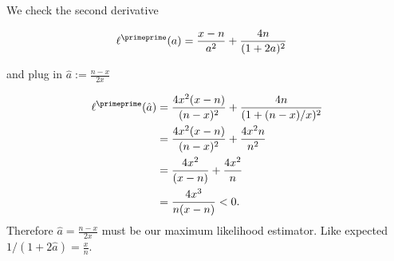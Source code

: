 \begin{solution}
We check the second derivative

\begin{align*}
  \ell^{\primeprime}(a) &= \frac{x-n}{a^2} + \frac{4n}{(1 + 2a)^2}
\end{align*}

and plug in $\hat{a} := \frac{n-x}{2x}$

\begin{align*}
  \ell^{\primeprime}(\hat{a}) &= \frac{4x^2(x-n)}{(n-x)^2} + 
  \frac{4n}{(1 + (n-x)/x)^2} \\
  &= \frac{4x^2(x-n)}{(n-x)^2} + \frac{4x^2n}{n^2} \\
  &= \frac{4x^2}{(x-n)} + \frac{4x^2}{n} \\
  &= \frac{4x^3}{n(x-n)} < 0.
\end{align*}
Therefore $\hat{a} = \frac{n-x}{2x}$ must be our maximum likelihood estimator.
Like expected $1/(1+2\hat{a}) = \frac{x}{n}$.

\end{solution}

